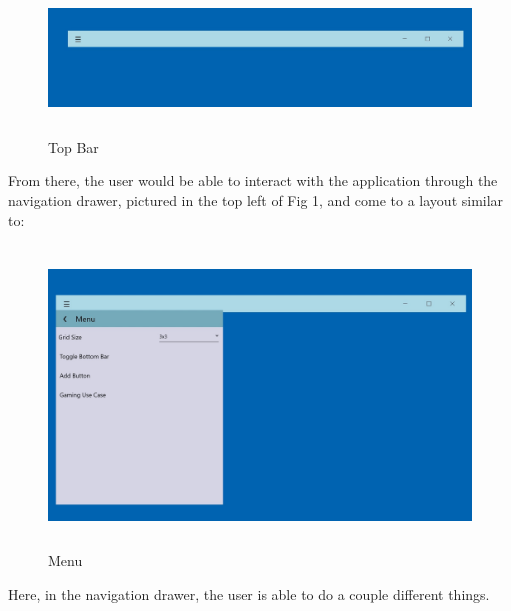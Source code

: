 \documentclass[fullpage, 10pt, onecolumn, draftclsnofoot]{IEEEtran}
\begin{document}
\begin{figure}[H]
    \centering
    \includegraphics[width=14cm, height=4cm]{images/topBar.jpg}
    \caption{Top Bar}
    \label{fig:my_label}
\end{figure}

From there, the user would be able to interact with the application through the navigation drawer, pictured in the top left of Fig 1, and come to a layout similar to: 
\begin{figure}[H]
    \centering
    \includegraphics[width=14cm, height=8cm]{images/navBar.jpg}
    \caption{Menu}
    \label{fig:my_label}
\end{figure}
Here, in the navigation drawer, the user is able to do a couple different things.
\end{document}
